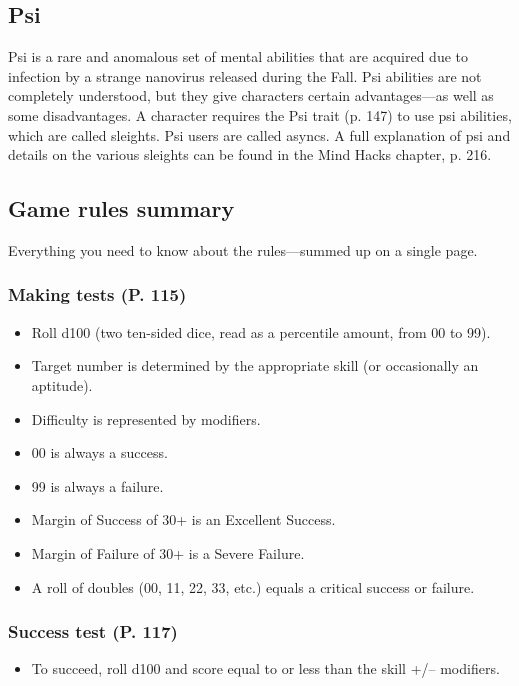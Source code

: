 \subsection{Psi}
\label{sec:psi}

Psi is a rare and anomalous set of mental abilities that are acquired due to infection by a strange nanovirus released during the Fall. Psi abilities are not completely understood, but they give characters certain advantages—as well as some disadvantages. A character requires the Psi trait (p. 147) to use psi abilities, which are called sleights. Psi users are called asyncs. A full explanation of psi and details on the various sleights can be found in the Mind Hacks chapter, p. 216.

 \subsection{Game rules summary}
\label{sec:game-rules-summary}

Everything you need to know about the rules—summed up on a single page.

\subsubsection{Making tests (P. 115)}

\begin{itemize}
\item Roll d100 (two ten-sided dice, read as a percentile amount, from 00 to 99).
\item Target number is determined by the appropriate skill (or occasionally an aptitude).
\item Difficulty is represented by modifiers.
\item 00 is always a success.
\item 99 is always a failure.
\item Margin of Success of 30+ is an Excellent Success.
\item Margin of Failure of 30+ is a Severe Failure.
\item A roll of doubles (00, 11, 22, 33, etc.) equals a critical success or failure.
\end{itemize}

\subsubsection{Success test (P. 117)}

\begin{itemize}
\item To succeed, roll d100 and score equal to or less than the skill +/– modifiers.
\end{itemize}

